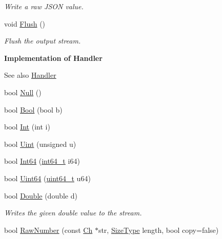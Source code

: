 \begin{DoxyCompactItemize}
\begin{DoxyCompactList}\small\item\em Write a raw J\+S\+ON value. \end{DoxyCompactList}\item 
void \mbox{\hyperlink{classrapidjson_1_1_writer_a72cefd18d176bc12a53adb3185c51ca7}{Flush}} ()
\begin{DoxyCompactList}\small\item\em Flush the output stream. \end{DoxyCompactList}\end{DoxyCompactItemize}
\begin{Indent}\textbf{ Implementation of Handler}\par
{\em \begin{DoxySeeAlso}{See also}
\mbox{\hyperlink{classrapidjson_1_1_handler}{Handler}} 
\end{DoxySeeAlso}
}\begin{DoxyCompactItemize}
\item 
bool \mbox{\hyperlink{classrapidjson_1_1_writer_a1e857b9fe7071fc0b9fa89b56ad05651}{Null}} ()
\item 
bool \mbox{\hyperlink{classrapidjson_1_1_writer_afd055764da99bd167b030c19104b107a}{Bool}} (bool b)
\item 
bool \mbox{\hyperlink{classrapidjson_1_1_writer_a22fd25fb5cb2db6c25762961e51e9c46}{Int}} (int i)
\item 
bool \mbox{\hyperlink{classrapidjson_1_1_writer_a49f2dd265ab15ee065f0506a8d3efac9}{Uint}} (unsigned u)
\item 
bool \mbox{\hyperlink{classrapidjson_1_1_writer_ae11f678a8f363b690629f53bdf33b5af}{Int64}} (\mbox{\hyperlink{stdint_8h_a414156feea104f8f75b4ed9e3121b2f6}{int64\+\_\+t}} i64)
\item 
bool \mbox{\hyperlink{classrapidjson_1_1_writer_a76e9e1271747e3fd5e0d665da69f1de7}{Uint64}} (\mbox{\hyperlink{stdint_8h_aec6fcb673ff035718c238c8c9d544c47}{uint64\+\_\+t}} u64)
\item 
bool \mbox{\hyperlink{classrapidjson_1_1_writer_aff66881798d01e932a0b8b8ef97b0373}{Double}} (double d)
\begin{DoxyCompactList}\small\item\em Writes the given {\ttfamily double} value to the stream. \end{DoxyCompactList}\item 
bool \mbox{\hyperlink{classrapidjson_1_1_writer_a65a378b4de5df3fb02521a4a78b25230}{Raw\+Number}} (const \mbox{\hyperlink{classrapidjson_1_1_writer_a2cf973937ca1110293bf1350fac2a6d6}{Ch}} $\ast$str, \mbox{\hyperlink{namespacerapidjson_a44eb33eaa523e36d466b1ced64b85c84}{Size\+Type}} length, bool copy=false)

\end{DoxyCompactItemize}
\end{Indent}
